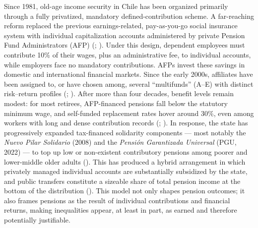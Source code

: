 \documentclass[
  12pt,
]{article}
\begin{document}
Since 1981, old-age income security in Chile has been organized
primarily through a fully privatized, mandatory defined-contribution
scheme. A far-reaching reform replaced the previous earnings-related,
pay-as-you-go social insurance system with individual capitalization
accounts administered by private Pension Fund Administrators (AFP)
(;
). Under this design,
dependent employees must contribute 10\% of their wages, plus an
administrative fee, to individual accounts, while employers face no
mandatory contributions. AFPs invest these savings in domestic and
international financial markets. Since the early 2000s, affiliates have
been assigned to, or have chosen among, several ``multifunds'' (A--E)
with distinct risk--return profiles
(;
). After more
than four decades, benefit levels remain modest: for most retirees,
AFP-financed pensions fall below the statutory minimum wage, and
self-funded replacement rates hover around 30\%, even among workers with
long and dense contribution records
(;
). In
response, the state has progressively expanded tax-financed solidarity
components --- most notably the \emph{Nuevo Pilar Solidario} (2008) and
the \emph{Pensión Garantizada Universal} (PGU, 2022) --- to top up low
or non-existent contributory pensions among poorer and lower-middle
older adults (). This has
produced a hybrid arrangement in which privately managed individual
accounts are substantially subsidized by the state, and public transfers
constitute a sizeable share of total pension income at the bottom of the
distribution (). This model not only shapes pension outcomes; it also frames
pensions as the result of individual contributions and financial
returns, making inequalities appear, at least in part, as earned and
therefore potentially justifiable.
\end{document}
